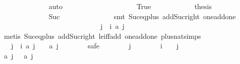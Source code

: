 \begin{isabellebody}
\ \ \ \ \ \ \ \ \ \ \ \ \isamarkupfalse%
\ auto\isanewline
\ \ \ \ \ \ \ \ \isamarkupfalse%
\isanewline
\ \ \ \ \ \ \ \ \ \ \isamarkupfalse%
\ True\isanewline
\ \ \ \ \ \ \ \ \ \ \isamarkupfalse%
\ {\isacharquery}thesis\isanewline
\ \ \ \ \ \ \ \ \ \ \ \ \isamarkupfalse%
\ Suc{\isacharparenleft}{}{\isacharparenright}\ {\isacharasterisk}\isanewline
\ \ \ \ \ \ \ \ \ \ \ \ \isamarkupfalse%
\ {\isacharparenleft}smt\ Suc{\isacharunderscore}eq{\isacharunderscore}plus{}\ add{\isacharunderscore}Suc{\isacharunderscore}right\ one{\isacharunderscore}add{\isacharunderscore}one{\isacharparenright}\isanewline
\ \ \ \ \ \ \ \ \isamarkupfalse%
\isanewline
\ \ \ \ \ \ \isamarkupfalse%
\isanewline
\ \ \ \ \isamarkupfalse%
\isanewline
\isanewline
\ \ \ \ \isamarkupfalse%
\ \isamarkupfalse%
\ {\isachardoublequoteopen}{\isasymforall}\ j\ {\isasymge}\ i{\isacharplus}{}{\isachardot}\ {\isacharquery}a\ j\ {\isachargreater}\ {}{\isachardoublequoteclose}\isanewline
\ \ \ \ \ \ \isamarkupfalse%
\ {\isacharparenleft}metis\ Suc{\isacharunderscore}eq{\isacharunderscore}plus{}\ add{\isacharunderscore}Suc{\isacharunderscore}right\ le{\isacharunderscore}iff{\isacharunderscore}add\ one{\isacharunderscore}add{\isacharunderscore}one\ plus{\isacharunderscore}nat{\isachardot}simps{\isacharparenleft}{}{\isacharparenright}{\isacharparenright}\isanewline
\isanewline
\ \ \ \ \isamarkupfalse%
\ {\isacharasterisk}{\isacharcolon}\ {\isachardoublequoteopen}{\isasymforall}\ j\ {\isasymge}\ i{\isacharplus}{}{\isachardot}\ {\isacharquery}a\ {\isacharparenleft}j\ {\isacharplus}\ {}{\isacharparenright}\ {\isachargreater}\ {\isacharquery}a\ {\isacharparenleft}j\ {\isacharplus}\ {}{\isacharparenright}{\isachardoublequoteclose}\isanewline
\ \ \ \ \isamarkupfalse%
\ safe\isanewline
\ \ \ \ \ \ \isamarkupfalse%
\ j\isanewline
\ \ \ \ \ \ \isamarkupfalse%
\ {\isachardoublequoteopen}i\ {\isacharplus}\ {}\ {\isasymle}\ j{\isachardoublequoteclose}\isanewline
\ \ \ \ \ \ \isamarkupfalse%
\ \isamarkupfalse%
\ {\isachardoublequoteopen}{\isacharquery}a\ j\ {\isachargreater}\ {}{\isachardoublequoteclose}\ {\isachardoublequoteopen}{\isacharquery}a\ {\isacharparenleft}j\ {\isacharplus}\ {}{\isacharparenright}\ {\isachargreater}\ {}{\isachardoublequoteclose}\isanewline

\end{isabellebody}
